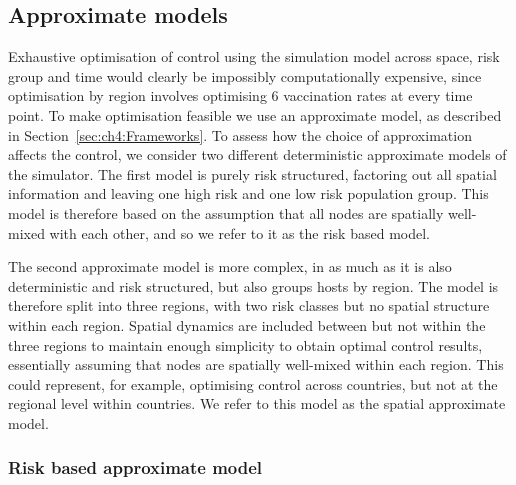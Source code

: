 \subsection{Approximate models}

Exhaustive optimisation of control using the simulation model across space, risk group and time would clearly be impossibly computationally expensive, since optimisation by region involves optimising 6 vaccination rates at every time point. To make optimisation feasible we use an approximate model, as described in Section~\ref{sec:ch4:Frameworks}. To assess how the choice of approximation affects the control, we consider two different deterministic approximate models of the simulator. The first model is purely risk structured, factoring out all spatial information and leaving one high risk and one low risk population group. This model is therefore based on the assumption that all nodes are spatially well-mixed with each other, and so we refer to it as the risk based model.

The second approximate model is more complex, in as much as it is also deterministic and risk structured, but also groups hosts by region. The model is therefore split into three regions, with two risk classes but no spatial structure within each region. Spatial dynamics are included between but not within the three regions to maintain enough simplicity to obtain optimal control results, essentially assuming that nodes are spatially well-mixed within each region. This could represent, for example, optimising control across countries, but not at the regional level within countries. We refer to this model as the spatial approximate model.

\subsubsection*{Risk based approximate model}

